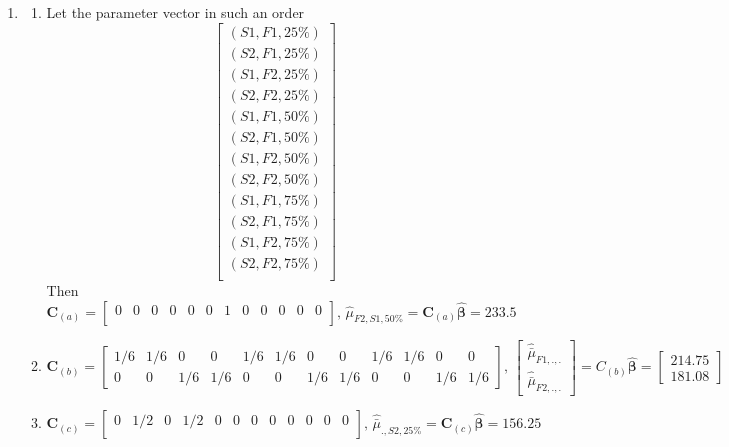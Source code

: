\documentclass{article}
\begin{document}
\begin{enumerate}[leftmargin = 0 em, label = \arabic*., font = \bfseries]
	\item 
	\begin{enumerate}
		\item 
		Let the parameter vector in such an order
		\[\begin{bmatrix}
			(S1, F1, 25\%)\\
			(S2, F1, 25\%)\\
			(S1, F2, 25\%)\\
			(S2, F2, 25\%)\\
			(S1, F1, 50\%)\\
			(S2, F1, 50\%)\\
			(S1, F2, 50\%)\\
			(S2, F2, 50\%)\\
			(S1, F1, 75\%)\\
			(S2, F1, 75\%)\\
			(S1, F2, 75\%)\\
			(S2, F2, 75\%)\\
		\end{bmatrix}\]
		Then
		\[\bm C_{(a)} = \begin{bmatrix}
			0&0&0&0&0&0&1&0&0&0&0&0\\

		\end{bmatrix},\, \hat{\mu}_{F2,S1,50\%} = \bm C_{(a)} \hat{\bm \beta} = 233.5\]

		

		\item 
		
		\[\bm C_{(b)} = \begin{bmatrix}
			1/6&1/6&0&0&1/6&1/6&0&0&1/6&1/6&0&0\\
			0&0&1/6&1/6&0&0&1/6&1/6&0&0&1/6&1/6
		\end{bmatrix},\, \begin{bmatrix}
			\hat{\bar{\mu}}_{F1,.,.}\\
			\hat{\bar{\mu}}_{F2,.,.}
		\end{bmatrix} = C_{(b)} \hat{\bm \beta} =\begin{bmatrix}
			214.75\\
			181.08
		\end{bmatrix}\]

		\item 
		\[\bm C_{(c)} = \begin{bmatrix}
			0&1/2&0&1/2&0&0&0&0&0&0&0&0\\

		\end{bmatrix},\, \hat{\bar{\mu}}_{.,S2,25\%} = \bm C_{(c)} \hat{\bm \beta} = 156.25\]


\end{enumerate}
\end{enumerate}
\end{document}

